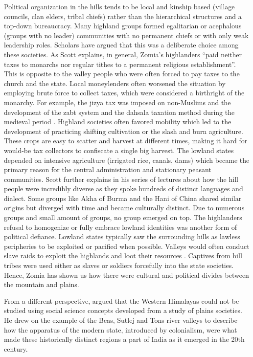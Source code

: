 Political organization in the hills tends to be local and kinship based (village councils, clan elders, tribal chiefs) rather than the hierarchical structures and a top\hyp{}down bureaucracy. Many highland groups formed egalitarian or acephalous (groups with no leader) communities with no permanent chiefs or with only weak leadership roles. Scholars have argued that this was a deliberate choice among these societies. As Scott explains, in general, Zomia's highlanders ``paid neither taxes to monarchs nor regular tithes to a permanent religious establishment”. This is opposite to the valley people who were often forced to pay taxes to the church and the state. Local moneylenders often worsened the situation by employing brute force to collect taxes, which were considered a birthright of the monarchy. For example, the jizya tax was imposed on non\hyp{}Muslims and the development of the zabt system and the dahsala taxation method during the medieval period \citep{moosvi1973production}. Highland societies often favored mobility which led to the development of practicing shifting cultivation or the slash and burn agriculture. These crops are easy to scatter and harvest at different times, making it hard for would\hyp{}be tax collectors to confiscate a single big harvest. The lowland states depended on intensive agriculture (irrigated rice, canals, dams) which became the primary reason for the central administration and stationary peasant communities. Scott further explains in his series of lectures  \citep{scott2005civilizations} about how the hill people were incredibly diverse as they spoke hundreds of distinct languages and dialect. Some groups like Akha of Burma and the Hani of China shared similar origins \citep{boonyasaranai2014common} but diverged with time and became culturally distinct. Due to numerous groups and small amount of groups, no group emerged on top. The highlanders refusal to homogenize or fully embrace lowland identities was another form of political defiance. Lowland states typically saw the surrounding hills as lawless peripheries to be exploited or pacified when possible. Valleys would often conduct slave raids to exploit the highlands and loot their resources \citep{walker1999legend}. Captives from hill tribes were used either as slaves or soldiers forcefully into the state societies. Hence, Zomia has shown us how there were cultural and political divides between the mountain and plains.

From a different perspective, \cite{alam2008becoming} argued that the Western Himalayas could not be studied using social science concepts developed from a study of plains societies. He drew on the example of the Beas, Sutlej and Tons river valleys to describe how the apparatus of the modern state, introduced by colonialism, were what made these historically distinct regions a part of India as it emerged in the 20th century.


